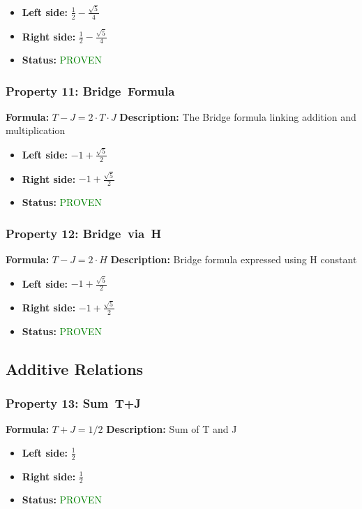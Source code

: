 \begin{itemize}
\item \textbf{Left side:} $\frac{1}{2} - \frac{\sqrt{5}}{4}$
\item \textbf{Right side:} $\frac{1}{2} - \frac{\sqrt{5}}{4}$
\item \textbf{Status:} \textcolor{green}{PROVEN}
\end{itemize}

\subsubsection*{Property 11: Bridge~Formula}
\textbf{Formula:} $T - J = 2 \cdot T \cdot J$
\textbf{Description:} The Bridge formula linking addition and multiplication

\begin{itemize}
\item \textbf{Left side:} $-1 + \frac{\sqrt{5}}{2}$
\item \textbf{Right side:} $-1 + \frac{\sqrt{5}}{2}$
\item \textbf{Status:} \textcolor{green}{PROVEN}
\end{itemize}

\subsubsection*{Property 12: Bridge~via~H}
\textbf{Formula:} $T - J = 2 \cdot H$
\textbf{Description:} Bridge formula expressed using H constant

\begin{itemize}
\item \textbf{Left side:} $-1 + \frac{\sqrt{5}}{2}$
\item \textbf{Right side:} $-1 + \frac{\sqrt{5}}{2}$
\item \textbf{Status:} \textcolor{green}{PROVEN}
\end{itemize}


\subsection{Additive Relations}

\subsubsection*{Property 13: Sum~T+J}
\textbf{Formula:} $T + J = 1/2$
\textbf{Description:} Sum of T and J

\begin{itemize}
\item \textbf{Left side:} $\frac{1}{2}$
\item \textbf{Right side:} $\frac{1}{2}$
\item \textbf{Status:} \textcolor{green}{PROVEN}
\end{itemize}

